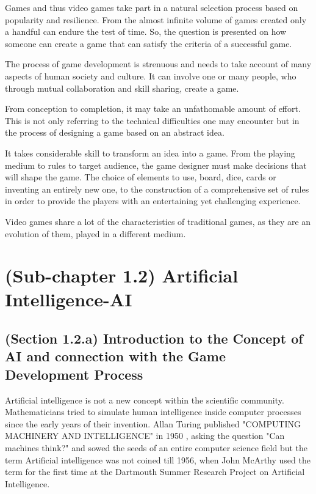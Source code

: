 \documentclass[a4paper,one side,12pt]{book}
\begin{document}
Games and thus video games take part in a natural selection process
based on popularity and resilience. From the almost infinite volume of
games created only a handful can endure the test of time. So, the
question is presented on how someone can create a game that can satisfy
the criteria of a successful game.

The process of game development is strenuous and needs to take account
of many aspects of human society and culture. It can involve one or many
people, who through mutual collaboration and skill sharing, create a
game.

From conception to completion, it may take an unfathomable amount of
effort. This is not only referring to the technical difficulties one may
encounter but in the process of designing a game based on an abstract
idea.

It takes considerable skill to transform an idea into a game. From the
playing medium to rules to target audience, the game designer must make
decisions that will shape the game. The choice of elements to use,
board, dice, cards or inventing an entirely new one, to the construction
of a comprehensive set of rules in order to provide the players with an
entertaining yet challenging experience.

Video games share a lot of the characteristics of traditional games, as
they are an evolution of them, played in a different medium.


\section{(Sub-chapter 1.2) Artificial Intelligence-AI}

\subsection{(Section 1.2.a) Introduction to the Concept of AI and connection with the Game Development Process}

Artificial intelligence is not a new concept within the scientific
community. Mathematicians tried to simulate human intelligence inside
computer processes since the early years of their invention. Allan
Turing published "COMPUTING MACHINERY AND INTELLIGENCE" in 1950 \cite{turing_1950_computing}, asking the question "Can machines think?" and sowed the seeds
of an entire computer science field but the term Artificial intelligence
was not coined till 1956, when John McArthy used the term for the first
time at the Dartmouth Summer Research Project on Artificial Intelligence.\cite{moor_2006}
\end{document}
